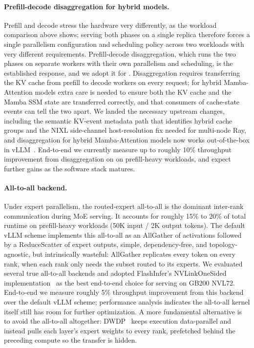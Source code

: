 \paragraph{Prefill-decode disaggregation for hybrid models.}
Prefill and decode stress the hardware very differently, as the workload
comparison above shows; serving both phases on a single replica therefore
forces a single parallelism configuration and scheduling policy across two
workloads with very different requirements.
Prefill-decode disaggregation, which runs the two phases on separate
workers with their own parallelism and scheduling, is the established
response, and we adopt it for \ourmodel{}. Disaggregation requires transferring
the KV cache from prefill to decode workers on every request; for hybrid
Mamba-Attention models extra care is needed to ensure both the KV cache
and the Mamba SSM state are transferred correctly, and that consumers of
cache-state events can tell the two apart. We landed the necessary
upstream changes, including the semantic KV-event metadata path that
identifies hybrid cache groups and the NIXL side-channel host-resolution
fix needed for multi-node Ray, and disaggregation for hybrid
Mamba-Attention models now works out-of-the-box in
vLLM~\citep{kwon2023efficientmemorymanagementlarge}. End-to-end we
currently measure up to roughly 10\% throughput improvement from
disaggregation on \ourmodel{} on prefill-heavy workloads, and expect
further gains as the software stack matures.

\paragraph{All-to-all backend.}
Under expert parallelism, the routed-expert all-to-all is the dominant
inter-rank communication during MoE serving. It accounts for roughly
15\% to 20\% of total runtime on prefill-heavy workloads
(50K input / 2K output tokens). The default vLLM scheme implements this all-to-all as an AllGather of
activations followed by a ReduceScatter of expert outputs, simple,
dependency-free, and topology-agnostic, but intrinsically wasteful:
AllGather replicates every token on every rank, when each rank only
needs the subset routed to its experts. We
evaluated several true all-to-all backends and adopted FlashInfer's
NVLinkOneSided implementation~\citep{nvidia2026nvlinkonesided} as the
best end-to-end choice for \ourmodel{} serving on GB200 NVL72. End-to-end we measure roughly 5\% throughput
improvement from this backend over the default vLLM scheme; performance
analysis indicates the all-to-all kernel itself still has room for
further optimization. A more fundamental alternative is to avoid the
all-to-all altogether: DWDP~\citep{nvidia2026dwdp} keeps execution
data-parallel and instead pulls each layer's expert weights to every rank,
prefetched behind the preceding compute so the transfer is hidden.

